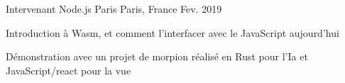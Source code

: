 

\begin{cventries}

  \cventry
    {Intervenant} %
    {Node.js Paris} %
    {Paris, France} %
    {Fev. 2019} %
    {
      \begin{cvitems} %
        \item {Introduction à Wasm, et comment l'interfacer avec le JavaScript aujourd'hui}
        \item {Démonstration avec un projet de morpion réalisé en Rust pour l'Ia et JavaScript/react pour la vue}
      \end{cvitems}
    }

\end{cventries}
